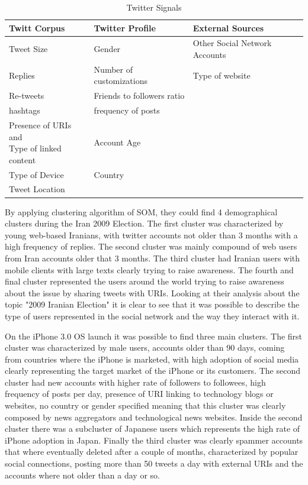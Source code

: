 \begin{table}[H]
  \caption{Twitter Signals}
  \label{tab:twitter_signals}
  \begin{center}
    \begin{tabular}{|l|l|l|}
    \hline

    \hline
    \textbf{Twitt Corpus} & \textbf{Twitter Profile} & \textbf{External Sources} \\
    \hline
       Tweet Size & Gender & Other Social Network Accounts\\
    \hline
       Replies & Number of customizations & Type of website\\
    \hline
       Re-tweets & Friends to followers ratio & \\
    \hline
       hashtags & frequency of posts & \\
    \hline
      \specialcell{Presence of URIs and \\ Type of linked content}
        & Account Age
        & \\
    \hline
       Type of Device & Country & \\
    \hline
       Tweet Location &  & \\
    \hline
    \end{tabular}
  \end{center}
\end{table}

By applying clustering algorithm of SOM, they could find 4 demographical clusters during the Iran 2009 Election. The first cluster was characterized by young web-based Iranians, with twitter accounts not older than 3 months with a high frequency of replies. The second cluster was mainly compound of web users from Iran accounts older that 3 months. The third cluster had Iranian users with mobile clients with large texts clearly trying to raise awareness. The fourth and final cluster represented the users around the world trying to raise awareness about the issue by sharing tweets with URIs.
Looking at their analysis about the topic "2009 Iranian Election" it is clear to see that it was possible to describe the type of users represented in the social network and the way they interact with it.

On the iPhone 3.0 OS launch it was possible to find three main clusters. The first cluster was characterized by male users, accounts older than 90 days, coming from countries where the iPhone is marketed, with high adoption of social media clearly representing the target market of the iPhone or its customers. The second cluster had new accounts with higher rate of followers to followees, high frequency of posts per day, presence of URI linking to technology blogs or websites, no country or gender specified meaning that this cluster was clearly composed by news aggregators and technological news websites. Inside the second cluster there was a subcluster of Japanese users which represents the high rate of iPhone adoption in Japan. Finally the third cluster was clearly spammer accounts that where eventually deleted after a couple of months, characterized by popular social connections, posting more than 50 tweets a day with external URIs and the accounts where not older than a day or so.

